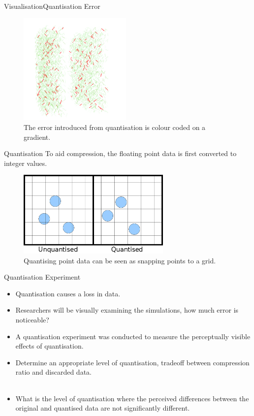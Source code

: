 \documentclass{beamer}
\begin{document}
\begin{frame}{Visualisation}{Quantisation Error}
\begin{figure}
  \centering
  \includegraphics[width=55mm]{min-images/quantisation-error-line.png}
  \caption{The error introduced from quantisation is colour coded on a gradient.}
\end{figure}
\end{frame}

\begin{frame}{Quantisation}
To aid compression, the floating point data is first converted to integer values.

\begin{figure}
  \centering
  \includegraphics[width=75mm]{min-images/quantisation.png}
  \caption{Quantising point data can be seen as snapping points to a grid.}
\end{figure}
\end{frame}

\begin{frame}{Quantisation Experiment}

\begin{itemize}

  \item Quantisation causes a loss in data.

  \item Researchers will be visually examining the simulations, how much error is noticeable?

  \item A quantisation experiment was conducted to measure the perceptually visible effects of quantisation.

  \item Determine an appropriate level of quantisation, tradeoff between compression ratio and discarded data. \\ \

  \item What is the level of quantisation where the perceived differences between the original and quantised data are not significantly different.

\end{itemize}

\end{frame}
\end{document}
